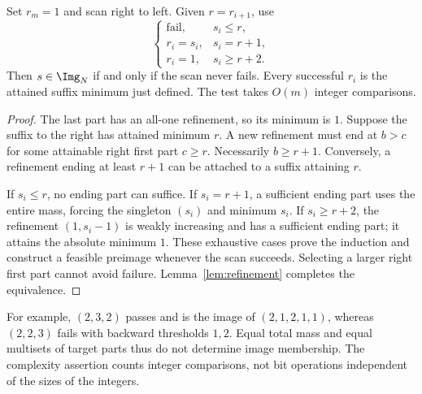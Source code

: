 \begin{theorem}\label{thm:image}
Set $r_m=1$ and scan right to left. Given $r=r_{i+1}$, use
\begin{equation}\label{eq:scan}
 \begin{cases}
 \text{fail},&s_i\le r,\\
 r_i=s_i,&s_i=r+1,\\
 r_i=1,&s_i\ge r+2.
 \end{cases}
\end{equation}
Then $s\in\Img_N$ if and only if the scan never fails. Every successful
$r_i$ is the attained suffix minimum just defined. The test takes $O(m)$
integer comparisons.
\end{theorem}
\begin{proof}
The last part has an all-one refinement, so its minimum is $1$. Suppose
the suffix to the right has attained minimum $r$. A new refinement must
end at $b>c$ for some attainable right first part $c\ge r$. Necessarily
$b\ge r+1$. Conversely, a refinement ending at least $r+1$ can be attached
to a suffix attaining $r$.

If $s_i\le r$, no ending part can suffice. If $s_i=r+1$, a sufficient
ending part uses the entire mass, forcing the singleton $(s_i)$ and minimum
$s_i$. If $s_i\ge r+2$, the refinement $(1,s_i-1)$ is weakly increasing
and has a sufficient ending part; it attains the absolute minimum $1$.
These exhaustive cases prove the induction and construct a feasible
preimage whenever the scan succeeds. Selecting a larger right first part
cannot avoid failure. Lemma~\ref{lem:refinement} completes the equivalence.
\end{proof}

For example, $(2,3,2)$ passes and is the image of $(2,1,2,1,1)$, whereas
$(2,2,3)$ fails with backward thresholds $1,2$. Equal total mass and equal
multisets of target parts thus do not determine image membership. The
complexity assertion counts integer comparisons, not bit operations
independent of the sizes of the integers.

